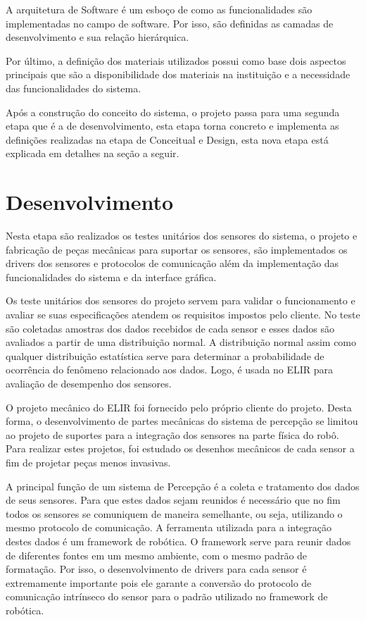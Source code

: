 A arquitetura de Software é um esboço de como as funcionalidades são implementadas no campo de software. Por isso, são definidas as camadas de desenvolvimento e sua relação hierárquica. 

Por último, a definição dos materiais utilizados possui como base dois aspectos principais que são a disponibilidade dos materiais na instituição e a necessidade das funcionalidades do sistema. 

Após a construção do conceito do sistema, o projeto passa para uma segunda etapa que é a de desenvolvimento, esta etapa torna concreto e implementa as definições realizadas na etapa de  Conceitual e Design, esta nova etapa está explicada em detalhes na seção a seguir.

\section{Desenvolvimento}

 Nesta etapa são realizados os testes unitários dos sensores do sistema, o projeto  e fabricação de peças mecânicas para suportar os sensores, são implementados os drivers dos sensores e protocolos de comunicação além da implementação das funcionalidades do sistema e da interface gráfica. 

Os teste unitários dos  sensores do projeto servem para validar o funcionamento e avaliar se suas especificações atendem os requisitos impostos pelo cliente. No teste são coletadas amostras dos dados recebidos de cada sensor e esses dados são avaliados a partir de uma distribuição normal. A distribuição normal assim como qualquer distribuição estatística serve para determinar a probabilidade de ocorrência do fenômeno relacionado aos dados. Logo, é usada no ELIR para avaliação de desempenho dos sensores.

O projeto mecânico do ELIR foi fornecido pelo próprio cliente do projeto. Desta forma, o desenvolvimento de partes mecânicas do sistema de percepção se limitou ao projeto de suportes para a integração dos sensores na parte física do robô. Para realizar estes projetos, foi estudado os desenhos mecânicos de cada sensor a fim de projetar peças menos invasivas.

A principal função de um sistema de Percepção é a coleta e tratamento dos dados de seus sensores. Para que estes dados sejam reunidos é necessário que no fim todos os sensores se comuniquem de maneira semelhante, ou seja, utilizando o mesmo protocolo de comunicação. A ferramenta utilizada para a integração destes dados é um framework de robótica. O framework serve para reunir dados de diferentes fontes em um mesmo ambiente, com o mesmo padrão de formatação. Por isso, o desenvolvimento de drivers para cada sensor é extremamente importante pois ele garante a conversão do protocolo de comunicação intrínseco do sensor para o padrão utilizado no framework de robótica.


